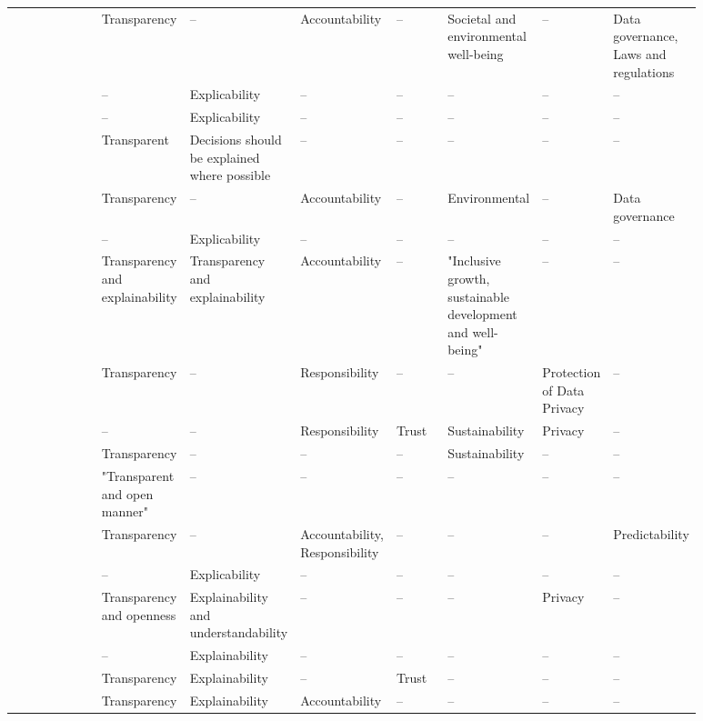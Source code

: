 \begin{landscape}
\begin{ThreePartTable}
\begin{longtable}{P{0.18\linewidth}P{0.1\linewidth}P{0.1\linewidth}P{0.12\linewidth}P{0.08\linewidth}P{0.1\linewidth}P{0.1\linewidth}P{0.1\linewidth}}
        \textcite{Mikalef_2022} & Transparency & -- & Accountability & -- & Societal and \mbox{environmental} well-being & -- & Data \mbox{governance}, Laws and \mbox{regulations} \\ 
        \textcite{Morley_2020} & -- & Explicability & -- & -- & -- & -- & -- \\ 
        \textcite{Morley_2021} & -- & Explicability & -- & -- & -- & -- & -- \\ 
        \textcite{Nauck_2019} & Transparent & Decisions should be explained where possible & -- & -- & -- & -- & -- \\ 
        \textcite{Papagiannidis_2022} & Transparency & -- & Accountability & -- & Environmental & -- & Data governance \\ 
        \textcite{Peters_2020} & -- & Explicability & -- & -- & -- & -- & -- \\ 
        \textcite{Rizinski_2022} & Transparency and explainability & Transparency and explainability & Accountability & -- & "Inclusive growth, sustainable \mbox{development} and well-being" & -- & -- \\ 
        \textcite{Rothenberger_2019} & Transparency & -- & Responsibility & -- & -- & Protection of Data Privacy & -- \\ 
        \textcite{Ryan_2021} & -- & -- & Responsibility & Trust & Sustainability & Privacy & -- \\ 
        \textcite{Siala_2022} & Transparency & -- & -- & -- & Sustainability & -- & -- \\ 
        \textcite{Thelisson_2018} & "Transparent and open manner" & -- & -- & -- & -- & -- & -- \\ 
        \textcite{Vakkuri_2022} & Transparency & -- & Accountability, \mbox{Responsibility} & -- & -- & -- & Predictability \\ 
        \textcite{vanBruxvoort_2021} & -- & Explicability & -- & -- & -- & -- & -- \\ 
        \textcite{Vetro_2019} & Transparency and openness & Explainability and understandability & -- & -- & -- & Privacy & -- \\  
        \textcite{WangW_2021} & -- & Explainability & -- & -- & -- & -- & -- \\ 
        \textcite{WangY_2020} & Transparency & Explainability & -- & Trust & -- & -- & -- \\
        \textcite{Werder_2022} & Transparency & Explainability & Accountability & -- & -- & -- & -- \\ 


\end{longtable}
\end{ThreePartTable}
\end{landscape}

